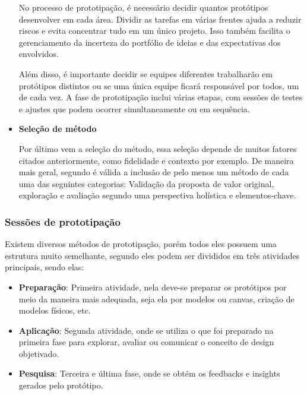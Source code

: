 \begin{itemize}
	No processo de prototipação, é necessário decidir quantos protótipos desenvolver em cada área. Dividir as tarefas em várias frentes ajuda a reduzir riscos e evita concentrar tudo em um único projeto. Isso também facilita o gerenciamento da incerteza do portfólio de ideias e das expectativas dos envolvidos.
	
	Além disso, é importante decidir se equipes diferentes trabalharão em protótipos distintos ou se uma única equipe ficará responsável por todos, um de cada vez. A fase de prototipação inclui várias etapas, com sessões de testes e ajustes que podem ocorrer simultaneamente ou em sequência.
	
	\item \textbf{Seleção de método}
	
	Por último vem a seleção do método, essa seleção depende de muitos fatores citados anteriormente, como fidelidade e contexto por exemplo. De maneira mais geral, segundo \cite{Stickdorn2019} é válida a inclusão de pelo menos um método de cada uma das seguintes categorias: Validação da proposta de valor original, exploração e avaliação segundo uma perspectiva holística e elementos-chave.
	
	
\end{itemize}

\subsubsection{Sessões de prototipação}

Existem diversos métodos de prototipação, porém todos eles possuem uma estrutura muito semelhante, segundo \cite{Stickdorn2019} eles podem ser divididos em três atividades principais, sendo elas:

\begin{itemize}
	\item \textbf{Preparação}: Primeira atividade, nela deve-se preparar os protótipos por meio da maneira mais adequada, seja ela por modelos ou canvas, criação de modelos físicos, etc.
	
	\item \textbf{Aplicação}: Segunda atividade, onde se utiliza o que foi preparado na primeira fase para explorar, avaliar ou comunicar o conceito de design objetivado.
	
	\item \textbf{Pesquisa}: Terceira e última fase, onde se obtém os feedbacks e insights gerados pelo protótipo.
\end{itemize}

